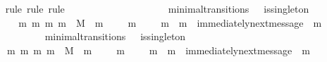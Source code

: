 \begin{isabellebody}
\ \ \ \ \isamarkupfalse%
\ {\isacharparenleft}rule{\isacharcomma}\ rule{\isacharcomma}\ rule{\isacharparenright}\isanewline
\ \ \isamarkupfalse%
\ {\isacharminus}\isanewline
\ \ \ \ \isamarkupfalse%
\ {\isasymsigma}\ {\isasymsigma}{\isacharprime}\isanewline
\ \ \ \ \isamarkupfalse%
\ {\isachardoublequoteopen}{\isacharparenleft}{\isasymsigma}{\isacharcomma}\ {\isasymsigma}{\isacharprime}{\isacharparenright}\ {\isasymin}\ minimal{\isacharunderscore}transitions\ {\isasymand}\ {\isasymnot}\ is{\isacharunderscore}singleton\ {\isacharparenleft}{\isasymsigma}{\isacharprime}\ {\isacharminus}\ {\isasymsigma}{\isacharparenright}{\isachardoublequoteclose}\isanewline
\ \ \ \ \isamarkupfalse%
\ \isamarkupfalse%
\ {\isachardoublequoteopen}{\isasymexists}\ m{}\ m{}{\isachardot}\ {\isacharbraceleft}m{}{\isacharcomma}\ m{}{\isacharbraceright}\ {\isasymsubseteq}\ M\ {\isasymand}\ m{}\ {\isasymin}\ {\isasymsigma}{\isacharprime}{\isacharminus}\ {\isasymsigma}\ {\isasymand}\ m{}\ {\isasymin}\ {\isasymsigma}{\isacharprime}{\isacharminus}\ {\isasymsigma}\ {\isasymand}\ m{}\ {\isasymnoteq}\ m{}\ {\isasymand}\ immediately{\isacharunderscore}next{\isacharunderscore}message\ {\isacharparenleft}{\isasymsigma}{\isacharcomma}\ m{}{\isacharparenright}{\isachardoublequoteclose}\isanewline
\ \ \ \ \ \ \isamarkupfalse%
\ {\isacartoucheopen}{\isasymforall}\ {\isasymsigma}\ {\isasymsigma}{\isacharprime}{\isachardot}\ {\isacharparenleft}{\isasymsigma}{\isacharcomma}\ {\isasymsigma}{\isacharprime}{\isacharparenright}\ {\isasymin}\ minimal{\isacharunderscore}transitions\ {\isasymand}\ {\isasymnot}\ is{\isacharunderscore}singleton\ {\isacharparenleft}{\isasymsigma}{\isacharprime}{\isacharminus}\ {\isasymsigma}{\isacharparenright}\isanewline
\ \ \ \ {\isasymlongrightarrow}\ {\isacharparenleft}{\isasymexists}\ m{}\ m{}{\isachardot}\ {\isacharbraceleft}m{}{\isacharcomma}\ m{}{\isacharbraceright}\ {\isasymsubseteq}\ M\ {\isasymand}\ m{}\ {\isasymin}\ {\isasymsigma}{\isacharprime}{\isacharminus}\ {\isasymsigma}\ {\isasymand}\ m{}\ {\isasymin}\ {\isasymsigma}{\isacharprime}{\isacharminus}\ {\isasymsigma}\ {\isasymand}\ m{}\ {\isasymnoteq}\ m{}\ {\isasymand}\ immediately{\isacharunderscore}next{\isacharunderscore}message\ {\isacharparenleft}{\isasymsigma}{\isacharcomma}\ m{}{\isacharparenright}{\isacharparenright}{\isacartoucheclose}\isanewline

\end{isabellebody}
